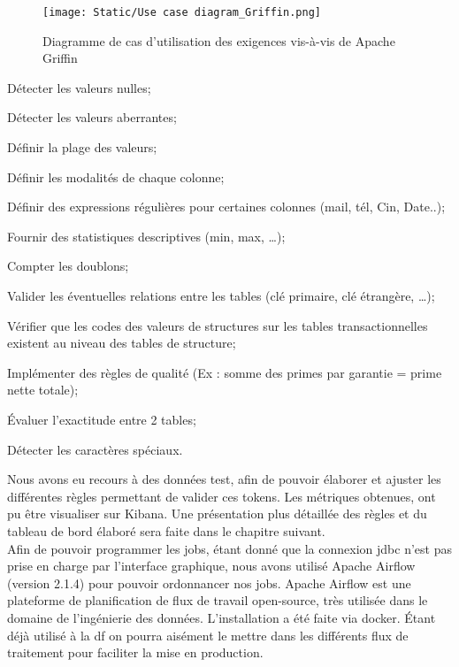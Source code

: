 \begin{figure}[H]
        \caption{Diagramme de cas d'utilisation des exigences vis-\`a-vis de Apache Griffin}  \label{fig:xray}
    \begin{center}
      \texttt{[image: Static/Use case diagram\_Griffin.png]} 
    \end{center}
\end{figure}
\begin{Token}[leftmargin=2cm,parsep=0cm,itemsep=0cm]
\item  D\'etecter les valeurs nulles;  
\item  D\'etecter les valeurs aberrantes; 
\item  Définir la plage des valeurs;
\item  Définir les modalités de chaque colonne;
\item  Définir des expressions régulières pour certaines colonnes (mail, tél, Cin, Date..);
\item  Fournir des statistiques descriptives (min, max, …);
\item  Compter les doublons;
\item  Valider les \'eventuelles relations entre les tables (clé primaire, clé étrangère, …);
\item  V\'erifier que les codes des valeurs de structures sur les tables transactionnelles existent au niveau des tables de structure;
\item  Implémenter des règles de qualité (Ex : somme des primes par garantie = prime nette totale);
\item  \'Evaluer l'exactitude entre 2 tables;
\item  D\'etecter les caractères spéciaux.
\end{Token}
Nous avons eu recours \`a des donn\'ees test, afin de pouvoir \'elaborer et ajuster les diff\'erentes r\`egles permettant de valider ces tokens. Les m\'etriques obtenues, ont pu \^etre visualiser sur Kibana. Une pr\'esentation plus détaillée des r\`egles et du tableau de bord \'elabor\'e sera faite dans le chapitre suivant.\\

Afin de pouvoir programmer les jobs, \'etant donn\'e que la connexion \acrshort{jdbc} n'est pas prise en charge par l'interface graphique, nous avons utilisé Apache Airflow (version 2.1.4) pour pouvoir ordonnancer nos jobs. Apache Airflow est une plateforme de planification de flux de travail open-source, très utilisée dans le domaine de l’ingénierie des données. L'installation a \'et\'e faite via docker. \'Etant d\'ej\`a utilis\'e \`a la \acrshort{df} on pourra aisément le mettre dans les diff\'erents flux de traitement pour faciliter la mise en production. \\

